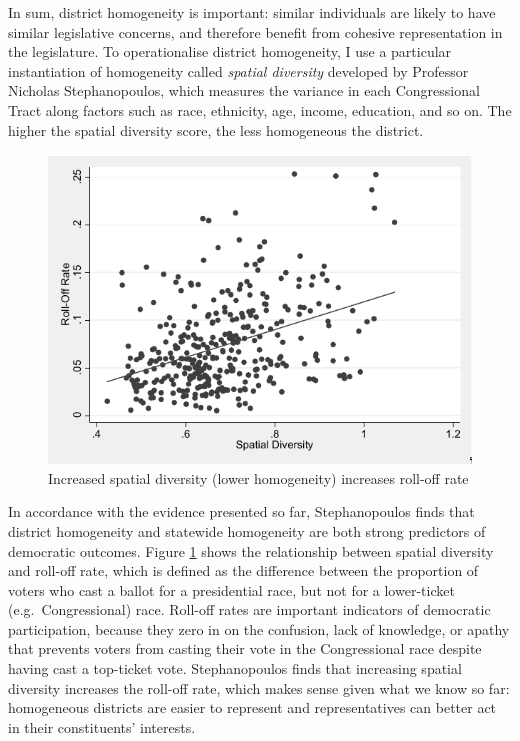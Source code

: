 \documentclass[]{article}
\begin{document}
In sum, district homogeneity is important: similar individuals are
likely to have similar legislative concerns, and therefore benefit from
cohesive representation in the legislature. To operationalise district
homogeneity, I use a particular instantiation of homogeneity called
\emph{spatial diversity} developed by Professor Nicholas Stephanopoulos,
which measures the variance in each Congressional Tract along factors
such as race, ethnicity, age, income, education, and so on. The higher
the spatial diversity score, the less homogeneous the district.

\begin{figure}
\centering
\includegraphics{img/sd_rolloff.png}
\caption{Increased spatial diversity (lower homogeneity) increases
roll-off rate \label{sd_rolloff}}
\end{figure}

In accordance with the evidence presented so far, Stephanopoulos finds
that district homogeneity and statewide homogeneity are both strong
predictors of democratic outcomes. Figure \ref{sd_rolloff} shows the
relationship between spatial diversity and roll-off rate, which is
defined as the difference between the proportion of voters who cast a
ballot for a presidential race, but not for a lower-ticket
(e.g.~Congressional) race. Roll-off rates are important indicators of
democratic participation, because they zero in on the confusion, lack of
knowledge, or apathy that prevents voters from casting their vote in the
Congressional race despite having cast a top-ticket vote. Stephanopoulos
finds that increasing spatial diversity increases the roll-off rate,
which makes sense given what we know so far: homogeneous districts are
easier to represent and representatives can better act in their
constituents' interests.
\end{document}
